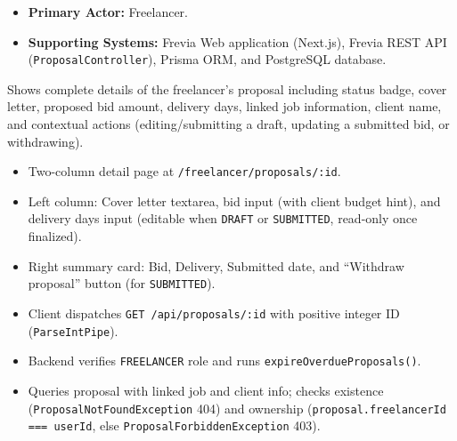 
\begin{itemize}[leftmargin=1.6em,topsep=3pt,itemsep=2pt,parsep=0pt,label=$\bullet$]
    \item \textbf{Primary Actor:} Freelancer.
    \item \textbf{Supporting Systems:} Frevia Web application (Next.js), Frevia REST API (\texttt{ProposalController}), Prisma ORM, and PostgreSQL database.
\end{itemize}

\noindent Shows complete details of the freelancer's proposal including status badge, cover letter, proposed bid amount, delivery days, linked job information, client name, and contextual actions (editing/submitting a draft, updating a submitted bid, or withdrawing).

\begin{itemize}[leftmargin=1.6em,topsep=3pt,itemsep=2pt,parsep=0pt,label=$\bullet$]
    \item Two-column detail page at \texttt{/freelancer/proposals/:id}.
    \item Left column: Cover letter textarea, bid input (with client budget hint), and delivery days input (editable when \texttt{DRAFT} or \texttt{SUBMITTED}, read-only once finalized).
    \item Right summary card: Bid, Delivery, Submitted date, and ``Withdraw proposal'' button (for \texttt{SUBMITTED}).
\end{itemize}

\begin{itemize}[leftmargin=1.6em,topsep=3pt,itemsep=2pt,parsep=0pt,label=$\bullet$]
    \item Client dispatches \texttt{GET /api/proposals/:id} with positive integer ID (\texttt{ParseIntPipe}).
    \item Backend verifies \texttt{FREELANCER} role and runs \texttt{expire\allowbreak{}Overdue\allowbreak{}Proposals()}.
    \item Queries proposal with linked job and client info; checks existence (\texttt{Proposal\allowbreak{}Not\allowbreak{}Found\allowbreak{}Exception} 404) and ownership (\texttt{proposal.\allowbreak{}freelancerId =\allowbreak{}=\allowbreak{}= userId}, else \texttt{Proposal\allowbreak{}Forbidden\allowbreak{}Exception} 403).
\end{itemize}

